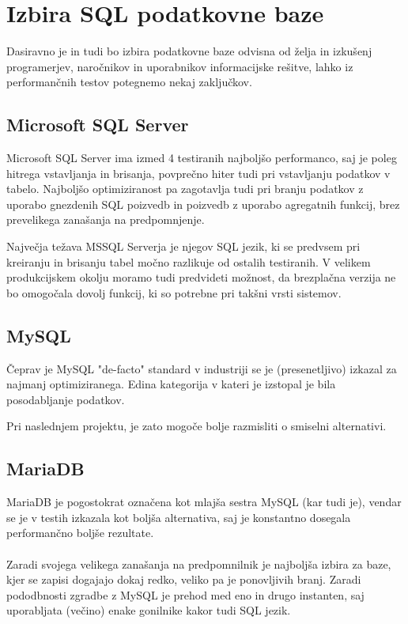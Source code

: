 \documentclass[a4paper,11pt]{report}
\begin{document}
\pagebreak
\section{Izbira SQL podatkovne baze}
Dasiravno je in tudi bo izbira podatkovne baze odvisna od želja in izkušenj programerjev, naročnikov in uporabnikov informacijske rešitve,
lahko iz performančnih testov potegnemo nekaj zaključkov.

\subsection{Microsoft SQL Server}
Microsoft SQL Server ima izmed 4 testiranih najboljšo performanco, saj je poleg hitrega vstavljanja in brisanja,
povprečno hiter tudi pri vstavljanju podatkov v tabelo. Najboljšo optimiziranost pa zagotavlja tudi pri branju podatkov
z uporabo gnezdenih SQL poizvedb in poizvedb z uporabo agregatnih funkcij, brez prevelikega zanašanja na predpomnjenje.

Največja težava MSSQL Serverja je njegov SQL jezik, ki se predvsem pri kreiranju in brisanju tabel močno razlikuje od ostalih testiranih.
V velikem produkcijskem okolju moramo tudi predvideti možnost, da brezplačna verzija ne bo omogočala dovolj funkcij, ki so potrebne pri takšni vrsti sistemov.

\subsection{MySQL}
Čeprav je MySQL "de-facto" standard v industriji se je (presenetljivo) izkazal za najmanj optimiziranega.
Edina kategorija v kateri je izstopal je bila posodabljanje podatkov. 

Pri naslednjem projektu, je zato mogoče bolje razmisliti o smiselni alternativi.

\subsection{MariaDB}
MariaDB je pogostokrat označena kot mlajša sestra MySQL (kar tudi je), vendar se je v testih izkazala kot boljša alternativa, saj je konstantno dosegala performančno boljše rezultate.
\\\\
Zaradi svojega velikega zanašanja na predpomnilnik je najboljša izbira za baze, kjer se zapisi dogajajo dokaj redko, veliko pa je ponovljivih branj.
Zaradi pododbnosti zgradbe z MySQL je prehod med eno in drugo instanten, saj uporabljata (večino) enake gonilnike kakor
tudi SQL jezik.
\end{document}
